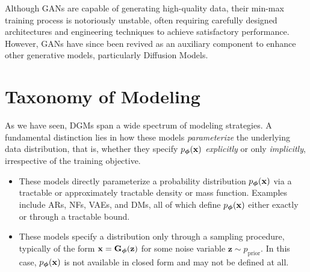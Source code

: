 
Although GANs are capable of generating high-quality data, their min-max training process is notoriously unstable, often requiring carefully designed architectures and engineering techniques to achieve satisfactory performance. However, GANs have since been revived as an auxiliary component to enhance other generative models, particularly Diffusion Models.






\newpage
\section{Taxonomy of Modeling}\label{sec:taxonomy}


As we have seen, DGMs span a wide spectrum of modeling strategies. A fundamental distinction lies in how these models \emph{parameterize} the underlying data distribution, that is, whether they specify $p_{\bm{\phi}}(\mathbf{x})$ \emph{explicitly} or only \emph{implicitly}, irrespective of the training objective.

\begin{itemize}
  \item {}  
  These models directly parameterize a probability distribution $p_{\bm{\phi}}(\mathbf{x})$ via a tractable or approximately tractable density or mass function. Examples include ARs, NFs, VAEs, and DMs, all of which define $p_{\bm{\phi}}(\mathbf{x})$ either exactly or through a tractable bound.

  \item {}  
  These models specify a distribution only through a sampling procedure, typically of the form $\mathbf{x} = {\mathbf{G}}_{\bm{\phi}}(\mathbf{z})$ for some noise variable $\mathbf{z} \sim p_{\mathrm{prior}}$. In this case, $p_{\bm{\phi}}(\mathbf{x})$ is not available in closed form and may not be defined at all.
\end{itemize}


